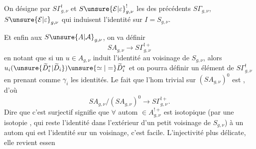 
On désigne par $S\Gamma^{!}_{g,\nu}$ et $S\unsure{\mathcal{E}|\varepsilon}^{!}_{g,\nu}$ les  des précédents $S\Gamma_{g,\nu}$, $S\unsure{\mathcal{E}|\varepsilon}_{g,\nu}$ qui induisent l'identité sur $I=S_{g,\nu}$.

Et  enfin aux  $S\unsure{A|\mathcal A}_{g,\nu}$, on va définir
\[
SA_{g,\nu}\longrightarrow S\Gamma^{!+}_{g,\nu}
\]
en  notant que si un $u\in A_{g,\nu}$ induit l'identité au voisinage de $S_{g,\nu}$, alors $u_i(\unsure{\widetilde D_i^{*}|\widetilde D_i})\unsure{\simeq|=}\widetilde D_i^{*}$ et on pourra définir un élément de $S\Gamma^{!}_{g,\nu}$ en prenant comme $\gamma_i$ les identités. Le fait que l'hom   trivial sur $(SA_{g,\nu})^0$ est , d'où
\[
SA_{g,\nu}/(SA_{g,\nu})^0\longrightarrow S\Gamma^{!+}_{g,\nu}.
\]
Dire que c'est surjectif signifie que $\forall$ autom $\in A_{g,\nu}^{!+}$  est isotopique (par une isotopie , qui reste l'identité dans l'extérieur d'un petit voisinage de $S_{g,\nu}$) à un autom qui est l'identité sur un voisinage, c'est facile. L'injectivité  plus délicate, elle revient essen



